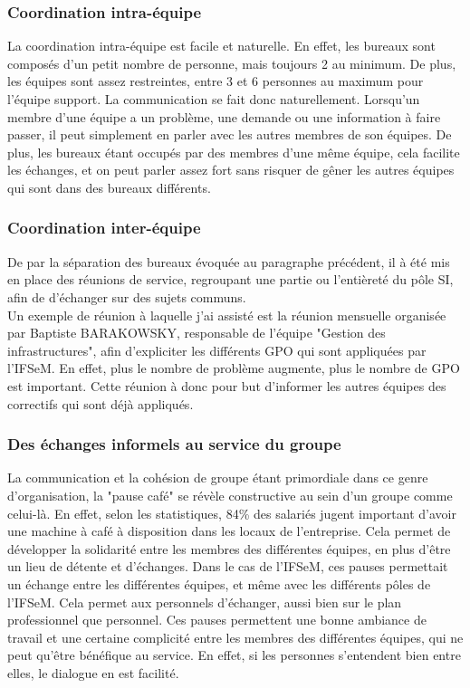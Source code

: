 \subsubsection{Coordination intra-équipe}
La coordination intra-équipe est facile et naturelle. En effet, les bureaux sont composés d'un petit nombre de personne, mais toujours 2 au minimum. De plus, les équipes sont assez restreintes, entre 3 et 6 personnes au maximum pour l'équipe support. La communication se fait donc naturellement. Lorsqu'un membre d'une équipe a un problème, une demande ou une information à faire passer, il peut simplement en parler avec les autres membres de son équipes. 
De plus, les bureaux étant occupés par des membres d'une même équipe, cela facilite les échanges, et on peut parler assez fort sans risquer de gêner les autres équipes qui sont dans des bureaux différents. 

\subsubsection{Coordination inter-équipe}
De par la séparation des bureaux évoquée au paragraphe précédent, il à été mis en place des réunions de service, regroupant une partie ou l'entièreté du pôle SI, afin de d'échanger sur des sujets communs. \\
Un exemple de réunion à laquelle j'ai assisté est la réunion mensuelle organisée par Baptiste BARAKOWSKY, responsable de l'équipe "Gestion des infrastructures", afin d'expliciter les différents GPO qui sont appliquées par l'IFSeM. En effet, plus le nombre de problème augmente, plus le nombre de GPO est important. Cette réunion à donc pour but d'informer les autres équipes des correctifs qui sont déjà appliqués.

\subsubsection{Des échanges informels au service du groupe}
La communication et la cohésion de groupe étant primordiale dans ce genre d'organisation, la "pause café" se révèle constructive au sein d'un groupe comme celui-là. En effet, selon les statistiques, 84\% des salariés jugent important d'avoir une machine à café à disposition dans les locaux de l'entreprise. Cela permet de développer la solidarité entre les membres des différentes équipes, en plus d'être un lieu de détente et d'échanges.
\smallbreak
Dans le cas de l'IFSeM, ces pauses permettait un échange entre les différentes équipes, et même avec les différents pôles de l'IFSeM. Cela permet aux personnels d'échanger, aussi bien sur le plan professionnel que personnel. 
Ces pauses permettent une bonne ambiance de travail et une certaine complicité entre les membres des différentes équipes, qui ne peut qu'être bénéfique au service. En effet, si les personnes s'entendent bien entre elles, le dialogue en est facilité.  

